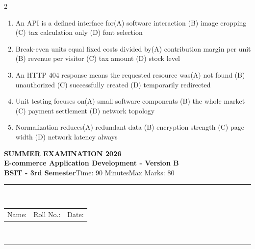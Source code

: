 \documentclass[a4paper]{article}
\makeatletter
\newcommand{\examheader}{%
\begin{center}\textbf{\large SUMMER EXAMINATION 2026}\\[-1pt]
\textbf{\normalsize E-commerce Application Development - Version B}\\[-1pt]
\textbf{BSIT - 3rd Semester}\quad Time: 90 Minutes\quad Max Marks: 80\\[-1pt]
\textcolor{black!65}{\rule{\linewidth}{0.45pt}}\\[-2pt]
\begin{tabularx}{\linewidth}{@{}X X X@{}}Name: \hrulefill & Roll No.: \hrulefill & Date: \hrulefill\end{tabularx}\\[-1pt]
\textcolor{black!65}{\rule{\linewidth}{0.45pt}}\end{center}}
\makeatother
\begin{document}
\begin{multicols*}{2}
\begin{enumerate}
\item An API is a defined interface for\newline\hspace*{0.6em}(A) software interaction \quad (B) image cropping \newline\hspace*{0.6em}(C) tax calculation only \quad (D) font selection
\item Break-even units equal fixed costs divided by\newline\hspace*{0.6em}(A) contribution margin per unit \quad (B) revenue per visitor \newline\hspace*{0.6em}(C) tax amount \quad (D) stock level
\item An HTTP 404 response means the requested resource was\newline\hspace*{0.6em}(A) not found \quad (B) unauthorized \newline\hspace*{0.6em}(C) successfully created \quad (D) temporarily redirected
\item Unit testing focuses on\newline\hspace*{0.6em}(A) small software components \quad (B) the whole market \newline\hspace*{0.6em}(C) payment settlement \quad (D) network topology
\item Normalization reduces\newline\hspace*{0.6em}(A) redundant data \quad (B) encryption strength \newline\hspace*{0.6em}(C) page width \quad (D) network latency always
\end{enumerate}
\end{multicols*}
\newpage
\examheader
\raggedcolumns
\end{document}

